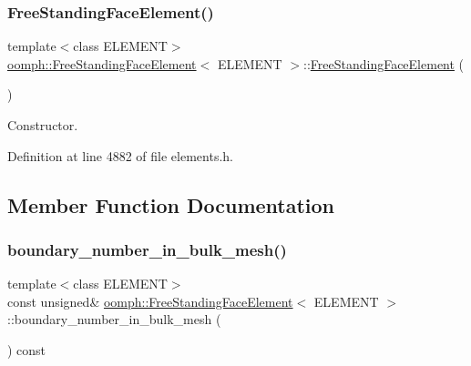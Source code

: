 \subsubsection{\texorpdfstring{Free\+Standing\+Face\+Element()}{FreeStandingFaceElement()}}
{\footnotesize\ttfamily template$<$class E\+L\+E\+M\+E\+NT$>$ \\
\hyperlink{classoomph_1_1FreeStandingFaceElement}{oomph\+::\+Free\+Standing\+Face\+Element}$<$ E\+L\+E\+M\+E\+NT $>$\+::\hyperlink{classoomph_1_1FreeStandingFaceElement}{Free\+Standing\+Face\+Element} (\begin{DoxyParamCaption}{ }\end{DoxyParamCaption})\hspace{0.3cm}{\ttfamily [inline]}}



Constructor. 



Definition at line 4882 of file elements.\+h.



\subsection{Member Function Documentation}
\mbox{\label{classoomph_1_1FreeStandingFaceElement_a6aeae669dbdc951e7df21422e693c991}} 
\subsubsection{\texorpdfstring{boundary\+\_\+number\+\_\+in\+\_\+bulk\+\_\+mesh()}{boundary\_number\_in\_bulk\_mesh()}}
{\footnotesize\ttfamily template$<$class E\+L\+E\+M\+E\+NT$>$ \\
const unsigned\& \hyperlink{classoomph_1_1FreeStandingFaceElement}{oomph\+::\+Free\+Standing\+Face\+Element}$<$ E\+L\+E\+M\+E\+NT $>$\+::boundary\+\_\+number\+\_\+in\+\_\+bulk\+\_\+mesh (\begin{DoxyParamCaption}{ }\end{DoxyParamCaption}) const\hspace{0.3cm}{\ttfamily [inline]}}



